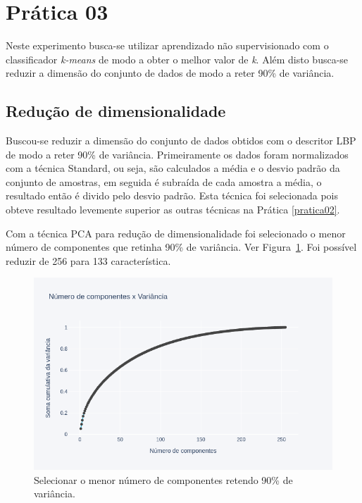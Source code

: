 \documentclass[a4paper, 12 pt, conference]{ieeeconf}  %
\begin{document}
\section{Prática 03}
\label{pratica03}

Neste experimento busca-se utilizar aprendizado não supervisionado com o classificador \textit{k-means} de modo a obter o melhor valor de \textit{k}. Além disto busca-se reduzir a dimensão do conjunto de dados de modo a reter 90\% de variância.

\subsection{Redução de dimensionalidade}

Buscou-se reduzir a dimensão do conjunto de dados obtidos com o descritor LBP de modo a reter 90\% de variância. Primeiramente os dados foram normalizados com a técnica Standard, ou seja, são calculados a média e o desvio padrão da conjunto de amostras, em seguida é subraída de cada amostra a média, o resultado então é divido pelo desvio padrão. Esta técnica foi selecionada pois obteve resultado levemente superior as outras técnicas na Prática \ref{pratica02}.

Com a técnica PCA para redução de dimensionalidade foi selecionado o menor número de componentes que retinha 90\% de variância. Ver Figura~\ref{fig:points_pca_lbp}. Foi possível reduzir de 256 para 133 característica.

\begin{figure}[!htbp]
	\centering
	\includegraphics[width=1.0\linewidth,clip=true,trim=0cm 0cm 0cm 0cm, keepaspectratio=true]{points_pca_lbp.png}
	\caption{Selecionar o menor número de componentes retendo 90\% de variância.}
	\label{fig:points_pca_lbp}
\end{figure}
\end{document}
